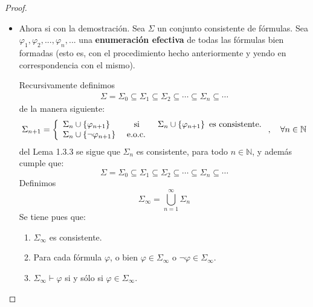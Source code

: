 \documentclass[12pt]{report}
\newcounter{it}
\theoremstyle{largebreak}
\begin{document}
\begin{proof}
\begin{itemize}
            \item Ahora si con la demostración. Sea $\Sigma$ un conjunto consistente de fórmulas. Sea $\varphi_1,\varphi_2,...,\varphi_n,...$ una \textbf{enumeración efectiva} de todas las fórmulas bien formadas (esto es, con el procedimiento hecho anteriormente y yendo en correspondencia con el mismo).
            
            Recursivamente definimos
            \begin{equation*}
                \begin{split}
                    \Sigma=\Sigma_0\subseteq\Sigma_1\subseteq\Sigma_2\subseteq\cdots\subseteq\Sigma_n\subseteq\cdots
                \end{split}
            \end{equation*}
            de la manera siguiente:
            \begin{equation*}
                \Sigma_{ n+1}=\left\{
                    \begin{array}{lcr}
                        \Sigma_n\cup\left\{\varphi_{n+1}\right\} & \textup{ si } & \Sigma_n\cup\left\{\varphi_{n+1}\right\} \textup{ es consistente.}\\
                        \Sigma_n\cup\left\{\neg\varphi_{n+1}\right\} & \textup{ e.o.c. } & \\
                    \end{array}
                \right.,\quad\forall n\in\mathbb{N}
            \end{equation*}
            del Lema 1.3.3 se sigue que $\Sigma_n$ es consistente, para todo $n\in\mathbb{N}$, y además cumple que:
            \begin{equation*}
                \Sigma=\Sigma_0\subseteq\Sigma_1\subseteq\Sigma_2\subseteq\cdots\subseteq\Sigma_n\subseteq\cdots
            \end{equation*}
            Definimos
            \begin{equation*}
                \Sigma_{\infty}=\bigcup_{ n=1}^\infty\Sigma_n
            \end{equation*}
            Se tiene pues que:
            \begin{enumerate}
                \item $\Sigma_{\infty}$ es consistente.
                \item Para cada fórmula $\varphi$, o bien $\varphi\in\Sigma_\infty$ o $\neg\varphi\in\Sigma_{\infty}$.
                \item $\Sigma_\infty\vdash\varphi$ si y sólo si $\varphi\in\Sigma_{\infty}$.

\end{enumerate}
\end{itemize}
\end{proof}
\end{document}
